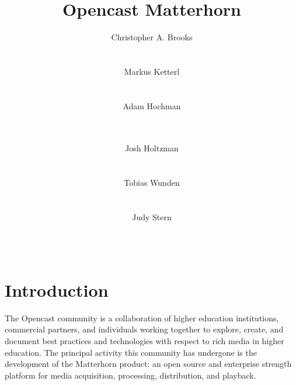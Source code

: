 \documentclass{sig-alternate}
\begin{document}
\title{Opencast Matterhorn}

\author{
%
\alignauthor
		Christopher A. Brooks \\
       \\
       \\
%
\alignauthor
		Markus Ketterl\\
       \\
       \\
%
\alignauthor
		Adam Hochman\\
       \\
       \\
\and
%
\alignauthor
		Josh Holtzman\\
       \\
       \\
%
\alignauthor
		Tobias Wunden\\
       \\
       \\
%
\alignauthor
		Judy Stern\\
       \\
       \\
}


\maketitle
\begin{abstract}
\end{abstract}


\section{Introduction}
The Opencast community is a collaboration of higher education institutions, commercial partners, and individuals working together to explore, create, and document best practices and technologies with respect to rich media in higher education.  The principal activity this community has undergone is the development of the Matterhorn product: an open source and enterprise strength platform for media acquisition, processing, distribution, and playback.
\end{document}
